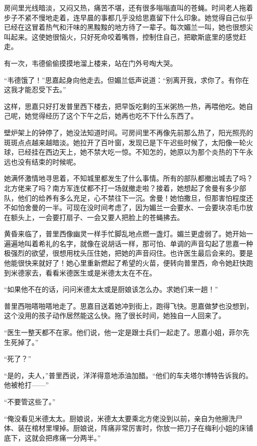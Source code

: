 \par 房间里光线暗淡，又闷又热，痛苦不堪，还有很多嗡嗡直叫的苍蝇。时间老人拖着步子不紧不慢地走着，连早晨的事都几乎没给思嘉留下什么印象。她觉得自己似乎已经在这冒着热气和汗味的黑黢黢的地方待了一辈子。每次媚兰一叫，她也很想尖叫起来。这使她很恼火，只好死命咬着嘴唇，控制住自己，把歇斯底里的感觉赶走。
\par 有一次，韦德偷偷摸摸地溜上楼来，站在门外号啕大哭。
\par “韦德饿了！”思嘉起身向他走去。但媚兰低声说道：“别离开我，求你了。有你在这我才能忍受下去。”
\par 这样，思嘉只好打发普里西下楼去，把早饭吃剩的玉米粥热一热，再喂他吃。她自己呢，她觉得经历了这个下午之后，她再也吃不下什么东西了。
\par 壁炉架上的钟停了，她没法知道时间。可房间里不再像先前那么热了，阳光照亮的斑斑点点越来越暗淡。她拉开了百叶窗，发现已是下午迟些时候了，太阳像一轮火球，已经挂在西边天上，她不禁大吃一惊。不知怎的，她原以为那个炎热的下午永远也没有结束的时候呢。
\par 她满怀激情地寻思着，不知城里都发生了什么事情。所有的部队都撤出城去了吗？北方佬来了吗？南方军连仗都不打一场就撤走啦？接着，她想起了舍曼有多少部队，他们的给养有多么充足，心不禁往下一沉。舍曼！她怕撒旦，但那害怕程度还不如怕舍曼的一半。可现在没时间考虑了，因为媚兰一会要水、一会要块凉毛巾放在额头上，一会要打扇子、一会又要人把脸上的苍蝇拂去。
\par 黄昏来临了，普里西像幽灵一样手忙脚乱地点燃一盏灯。媚兰更虚弱了。她开始一遍遍地叫着希礼的名字，就像在说胡话一样，那可怕、单调的声音勾起了思嘉一种极强烈的欲望，很想用枕头压住她，把她的声音闷住。也许医生最后会来的。要是他能很快来就好了！她心里重新燃起了希望的火苗，便转向普里西，命令她赶快跑到米德家去，看看米德医生或是米德太太在不在。
\par “如果他不在的话，问问米德太太或是厨娘该怎么办。求她们来一趟！”
\par 普里西啪嗒啪嗒地走了。思嘉目送着她冲到街上，跑得飞快。思嘉做梦也没想到，这个没用的孩子动作居然能这么快。拖了很长时间，她独自一人回来了。
\par “医生一整天都不在家。他们说，他一定是跟士兵们一起走了。思嘉小姐，菲尔先生死掉了。”
\par “死了？”
\par “是的，夫人，”普里西说，洋洋得意地添油加醋。“他们的车夫塔尔博特告诉我的。他被枪打——”
\par “不要管这些了。”
\par “俺没看见米德太太。厨娘说，米德太太要乘北方佬没到以前，亲自为他擦洗尸体、装在棺材里埋掉。厨娘说，阵痛非常厉害时，你放一把刀子在梅利小姐的床铺底下，这就会把疼痛一分两半。”
